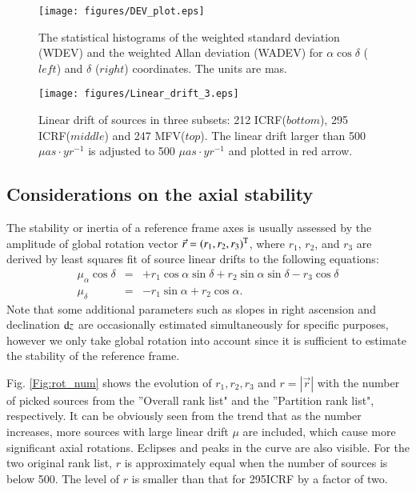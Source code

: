 \documentclass{aa}
\begin{document}
\begin{figure}
   \centering
   \texttt{[image: figures/DEV\_plot.eps]}
      \caption{
      The statistical histograms of the weighted standard deviation (WDEV) and the weighted Allan deviation (WADEV) for $\alpha\cos\delta$ ($left$) and $\delta$ ($right$) coordinates. The units are mas.
              }
         \label{Fig:Dev}
\end{figure}

\begin{figure}
   \centering
   \texttt{[image: figures/Linear\_drift\_3.eps]}
      \caption{
      Linear drift of sources in three subsets: 212 ICRF($bottom$), 295 ICRF($middle$) and 247 MFV($top$). The linear drift larger than 500 $\mu as\cdot yr^{-1}$ is adjusted to 500 $\mu as\cdot yr^{-1}$ and plotted in red arrow.
              }
         \label{Fig:Ld3}
   \end{figure}

%
\subsection{Considerations on the axial stability}
The stability or inertia of a reference frame axes is usually assessed by the amplitude of global rotation vector $\vec{r}=(r_1,r_2,r_3)^{\rm T}$, where $r_1$, $r_2$, and $r_3$ are derived by least squares fit of source linear drifts to the following equations:
\begin{eqnarray}\label{eq:rotation}
      \mu_{\alpha}\cos\delta & = & +r_1\cos\alpha\sin\delta +r_2\sin\alpha\sin\delta -r_3\cos\delta \nonumber \\
      \mu_{\delta} & = & -r_1\sin\alpha + r_2\cos\alpha.
\end{eqnarray}
Note that some additional parameters such as slopes in right ascension and declination ${\rm d}z$ are occasionally estimated simultaneously \citep[for example]{Lambert2013} for specific purposes, however we only take global rotation into account since it is sufficient to estimate the stability of the reference frame.

Fig. \ref{Fig:rot_num} shows the evolution of $r_1, r_2, r_3$ and $r = |\vec r|$ with the number of picked sources from the ''Overall rank list" and the ''Partition rank list", respectively. It can be obviously seen from the trend that as the number increases, more sources with large linear drift $\mu$ are included, which cause more significant axial rotations.  Eclipses and peaks in the curve are also visible. For the two original rank list, $r$ is approximately equal when the number of sources is below 500. The level of $r$ is smaller than that for 295ICRF by a factor of two.
\end{document}
